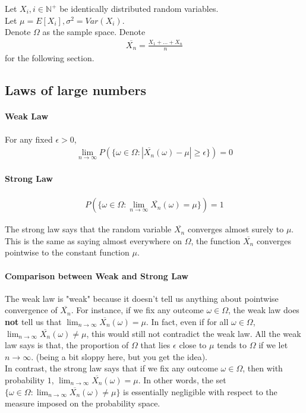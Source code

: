 \documentclass{article}
\begin{document}
Let $X_i, i\in \mathbb{N}^+$ be identically distributed random variables.\\
Let $\mu = E[X_i], \sigma^2 = Var(X_i)$.\\
Denote $\Omega$ as the sample space.
Denote 
\begin{align*}
\overline{X_n} = \frac{X_1+\dots + X_n}{n}
\end{align*}
for the following section.

\subsection{Laws of large numbers}
\paragraph{Weak Law}
For any fixed $\epsilon > 0$,
\begin{align*}
	\lim_{n\rightarrow \infty}P(\{\omega \in \Omega: |\overline{X_n}(\omega)-\mu|\geq \epsilon \}) = 0
\end{align*}

\paragraph{Strong Law}
\begin{align*}
	P(\{\omega \in \Omega: \lim_{n\rightarrow \infty}\overline{X_n}(\omega) = \mu \}) = 1
\end{align*}

The strong law says that the random variable $\overline{X_n}$ converges almost surely to $\mu$. This is the same as saying almost everywhere on $\Omega$, the function $\overline{X_n}$ converges pointwise to the constant function $\mu$.

\paragraph{Comparison between Weak and Strong Law}
The weak law is "weak" because it doesn't tell us anything about pointwise convergence of $\overline{X_n}$. For instance, if we fix any outcome $\omega \in \Omega$, the weak law does \textbf{not} tell us that $\lim_{n\rightarrow \infty}\overline{X_n}(\omega)=\mu$. In fact, even if for all $\omega \in \Omega$, $\lim_{n\rightarrow \infty}\overline{X_n}(\omega)\neq \mu$, this would still not contradict the weak law. All the weak law says is that, the proportion of $\Omega$ that lies $\epsilon$ close to $\mu$ tends to $\Omega$ if we let $n\rightarrow \infty$. (being a bit sloppy here, but you get the idea).
\\
In contrast, the strong law says that if we fix any outcome $\omega \in \Omega$, then with probability $1$, $\lim_{n\rightarrow \infty}\overline{X_n}(\omega)=\mu$. In other words, the set $\{\omega \in \Omega: \lim_{n\rightarrow \infty}\overline{X_n}(\omega) \neq \mu \}$ is essentially negligible with respect to the measure imposed on the probability space.
\end{document}

